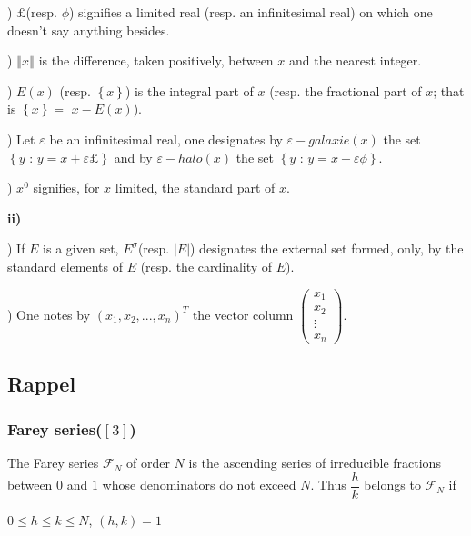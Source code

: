 \documentclass[12pt]{article}
\begin{document}
) $\pounds $(resp. $\phi $) signifies a limited real (resp. an
infinitesimal real) on which one doesn't say anything besides.

) $\left\Vert x\right\Vert $ is the difference, taken positively,
between $x$ and the nearest integer.

) $E\left( x\right) $ (resp. $\left\{ x\right\} $) is the
integral part of $x$ (resp. the fractional part of $x$; that is $\left\{
x\right\} =$ $x-E\left( x\right) $).

) Let $\varepsilon $ be an infinitesimal real, one designates by $%
\varepsilon -galaxie\left( x\right) $ the set $\left\{ y\text{ : }%
y=x+\varepsilon \pounds \right\} $ and by $\varepsilon -halo\left( x\right) $
the set $\left\{ y\text{ : }y=x+\varepsilon \phi \right\} $.

) $x^{0}$ signifies, for $x$ limited, the standard part of $x$.

\noindent \textbf{ii)}

) If $E$ is a given set, $E^{\sigma }$(resp. $\left\vert
E\right\vert $) designates the external set formed, only, by the standard
elements of $E$ (resp. the cardinality of $E$).

) One notes by $\left( x_{1},x_{2},...,x_{n}\right) ^{T}$ the
vector column $\left( 
\begin{array}{c}
x_{1} \\ 
x_{2} \\ 
\vdots \\ 
x_{n}%
\end{array}%
\right) $.

\subsection{\textbf{Rappel}}

\subsubsection{\textbf{Farey series}($\left[ 3\right] $)}

\noindent The Farey series $\mathcal{F}_{N}$ of order $N$ is the ascending
series of irreducible fractions between $0$ and $1$ whose denominators do
not exceed $N$. Thus $\dfrac{h}{k}$ belongs to $\mathcal{F}_{N}$ if

\begin{center}
$0\leq h\leq k\leq N$, $\left( h,k\right) =1$
\end{center}
\end{document}
